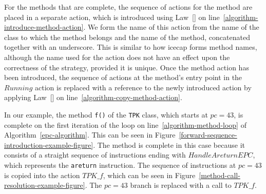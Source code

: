 For the methods that are complete, the sequence of actions for the
method are placed in a separate action, which is introduced using
Law~[] on
line~\ref{algorithm-introduce-method-action}.
We form the name of this action from the name of the class to which
the method belongs and the name of the method, concatenated together
with an underscore.
This is similar to how icecap forms method names, although the name
used for the action does not have an effect upon the correctness of
the strategy, provided it is unique.
Once the method action has been introduced, the sequence of actions at
the method's entry point in the $Running$ action is replaced with a
reference to the newly introduced action by applying
Law~[] on
line~\ref{algorithm-copy-method-action}.

In our example, the method \texttt{f()} of the \texttt{TPK} class,
which starts at $pc = 43$, is complete on the first iteration of the
loop on line~\ref{algorithm-method-loop} of
Algorithm~\ref{epc-algorithm}.
This can be seen in
Figure~\ref{forward-sequence-introduction-example-figure}.
The method is complete in this case because it consists of a straight
sequence of instructions ending with $HandleAreturnEPC$, which
represents the \texttt{areturn} instruction.
The sequence of instructions at $pc = 43$ is copied into the action $TPK\_f$,
which can be seen in
Figure~\ref{method-call-resolution-example-figure}.
The $pc = 43$ branch is replaced with a call to $TPK\_f$.

